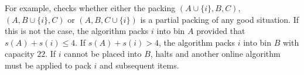 For example,  checks whether
either the packing $(A\cup \{i\},B,C)$, $(A,B\cup \{i\},C)$ or $(A,B,C\cup \{i\})$ is a partial packing of any good
situation. If this is not the case, the algorithm packs $i$ into bin
$A$ provided that $s(A)+s(i)\leq 4$. If $s(A) + s(i)>4$, the algorithm
packs $i$ into bin $B$ with capacity $22$. If $i$ cannot be placed
into $B$,  halts and another
online algorithm must be applied to pack $i$ and subsequent items.